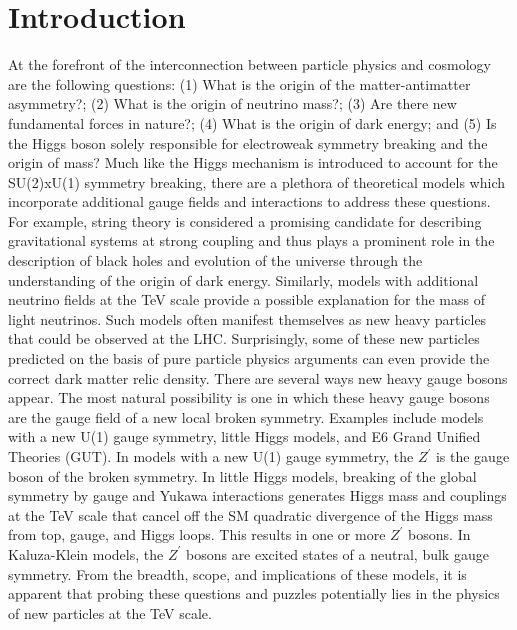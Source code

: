 \section{Introduction}\label{sec:intro}

At the forefront of the interconnection between particle physics and cosmology are the following questions: (1) What is the origin of the matter-antimatter 
asymmetry?; (2) What is the origin of neutrino mass?; (3) Are there new fundamental forces in nature?; (4) What is the origin of dark energy; and (5) Is the Higgs 
boson solely responsible for electroweak symmetry breaking and the origin of mass? Much like the Higgs mechanism is introduced to account for the SU(2)xU(1) 
symmetry breaking, there are a plethora of theoretical models which incorporate additional gauge fields and interactions to address these questions. For example, 
string theory is considered a promising candidate for describing gravitational systems at strong coupling and thus plays a prominent role in the description of 
black holes and evolution of the universe through the understanding of the origin of dark energy. Similarly, models with additional neutrino fields at the TeV 
scale provide a possible explanation for the mass of light neutrinos. Such models often manifest themselves as new heavy particles that could be observed at the 
LHC. Surprisingly, some of these new particles predicted on the basis of pure particle physics arguments can even provide the correct dark matter relic density. 
There are several ways new heavy gauge bosons appear. The most natural possibility is one in which these heavy gauge bosons are the gauge field of a new 
local broken symmetry. Examples include models with a new U(1) gauge symmetry, little Higgs models, and E6 Grand Unified Theories (GUT). 
In models with a new U(1) gauge symmetry, the $Z^\prime$ is the gauge boson of the broken symmetry. In
little Higgs models, breaking of the global symmetry by gauge and Yukawa interactions generates Higgs mass and couplings at the TeV scale that cancel off the SM
quadratic divergence of the Higgs mass from top, gauge, and Higgs loops. This results in one or more $Z^\prime$ bosons. In Kaluza-Klein models, the $Z^\prime$
bosons are excited states of a neutral, bulk gauge symmetry. From the breadth, scope, and implications of these models, it is apparent that probing these questions and puzzles potentially lies in 
the physics of new particles at the TeV scale. 

